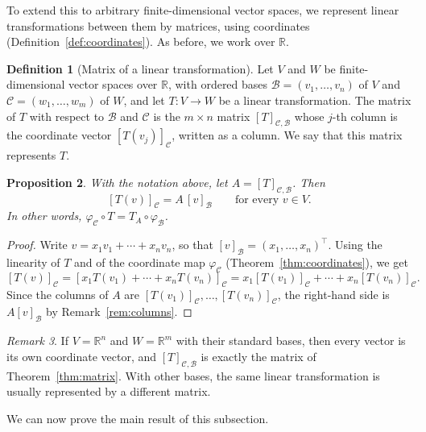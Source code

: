 \documentclass[11pt]{article}
\theoremstyle{definition}
\newtheorem{definition}{Definition}[section]
\theoremstyle{plain}
\newtheorem{proposition}[definition]{Proposition}
\theoremstyle{remark}
\newtheorem{remark}[definition]{Remark}
\begin{document}
To extend this to arbitrary finite-dimensional vector spaces, we represent linear transformations between them by matrices, using coordinates (Definition~\ref{def:coordinates}). As before, we work over $\mathbb{R}$.

\begin{definition}[Matrix of a linear transformation]
    Let $V$ and $W$ be finite-dimensional vector spaces over $\mathbb{R}$, with ordered bases $\mathcal{B} = (v_1, \ldots, v_n)$ of $V$ and $\mathcal{C} = (w_1, \ldots, w_m)$ of $W$, and let $T: V \to W$ be a linear transformation. The matrix of $T$ with respect to $\mathcal{B}$ and $\mathcal{C}$ is the $m \times n$ matrix $[T]_{\mathcal{C}, \mathcal{B}}$ whose $j$-th column is the coordinate vector $[T(v_j)]_{\mathcal{C}}$, written as a column. We say that this matrix represents $T$.
\end{definition}

\begin{proposition}\label{prop:matrix-coords}
    With the notation above, let $A = [T]_{\mathcal{C}, \mathcal{B}}$. Then
    \[[T(v)]_{\mathcal{C}} = A \, [v]_{\mathcal{B}} \qquad \text{for every } v \in V.\]
    In other words, $\varphi_{\mathcal{C}} \circ T = T_A \circ \varphi_{\mathcal{B}}$.
\end{proposition}

\begin{proof}
    Write $v = x_1 v_1 + \cdots + x_n v_n$, so that $[v]_{\mathcal{B}} = (x_1, \ldots, x_n)^\top$. Using the linearity of $T$ and of the coordinate map $\varphi_{\mathcal{C}}$ (Theorem~\ref{thm:coordinates}), we get
    \[[T(v)]_{\mathcal{C}} = [x_1 T(v_1) + \cdots + x_n T(v_n)]_{\mathcal{C}} = x_1 [T(v_1)]_{\mathcal{C}} + \cdots + x_n [T(v_n)]_{\mathcal{C}}.\]
    Since the columns of $A$ are $[T(v_1)]_{\mathcal{C}}, \ldots, [T(v_n)]_{\mathcal{C}}$, the right-hand side is $A [v]_{\mathcal{B}}$ by Remark~\ref{rem:columns}.
\end{proof}

\begin{remark}
    If $V = \mathbb{R}^n$ and $W = \mathbb{R}^m$ with their standard bases, then every vector is its own coordinate vector, and $[T]_{\mathcal{C}, \mathcal{B}}$ is exactly the matrix of Theorem~\ref{thm:matrix}. With other bases, the same linear transformation is usually represented by a different matrix.
\end{remark}

We can now prove the main result of this subsection.
\end{document}
